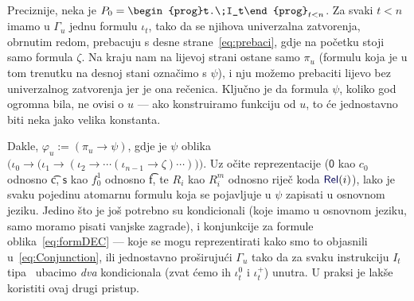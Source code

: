 Preciznije, neka je $P_0=\begin{prog}t.\;I_t\end{prog}_{t<n}$. Za svaki $t<n$ imamo u $\Gamma_u$ jednu formulu $\iota_t$, tako da se njihova univerzalna zatvorenja, obrnutim redom, prebacuju s desne strane~\eqref{eq:prebaci}, gdje na početku stoji samo formula $\zeta$. Na kraju nam na lijevoj strani ostane samo $\pi_u$ (formulu koja je u tom trenutku na desnoj stani označimo s $\psi$), i nju možemo prebaciti lijevo bez univerzalnog zatvorenja jer je ona rečenica. Ključno je da formula $\psi$, koliko god ogromna bila, ne ovisi o $u$ --- ako konstruiramo funkciju od $u$, to će jednostavno biti neka jako velika konstanta.

Dakle, $\varphi_u:=(\pi_u\to\psi)$, gdje je $\psi$ oblika $\bigl(\iota_0\to\bigl(\iota_1\to(\iota_2\to\dotsb(\iota_{n-1}\to\zeta)\dotsb)\bigr)\bigr)$\text.
Uz očite reprezentacije ($\mathsf0$ kao $c_0$ odnosno \t c, $\mathsf s$ kao $f_0^1$ odnosno \t f, te $R_i$ kao $R_i^m$ odnosno riječ koda $\f{Rel}(i)$), lako je svaku pojedinu atomarnu formulu koja se pojavljuje u $\psi$ zapisati u osnovnom jeziku. Jedino što je još potrebno su kondicionali (koje imamo u osnovnom jeziku, samo moramo pisati vanjske zagrade), i konjunkcije za formule oblika~\eqref{eq:formDEC} --- koje se mogu reprezentirati kako smo to objasnili u~\eqref{eq:Conjunction}, ili jednostavno proširujući $\Gamma_u$ tako da za svaku instrukciju $I_t$ tipa \dec\ ubacimo \emph{dva} kondicionala (zvat ćemo ih $\iota_t^0$ i $\iota_t^+$) unutra. U praksi je lakše koristiti ovaj drugi pristup.

